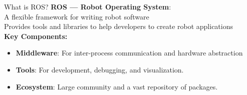 \documentclass[compress]{beamer}
\begin{document}
\begin{frame}{What is ROS?}
        \textbf{ROS --- Robot Operating System}: \\ A flexible framework for writing robot software\\
        
        \footnotesize
        Provides tools and libraries to help developers to create robot applications\\
        
        \vspace{.5cm}
        \textbf{Key Components:}
        \begin{itemize}
            \item \textbf{Middleware}: For inter-process communication and hardware abstraction
            \item \textbf{Tools}: For development, debugging, and visualization.
            \item \textbf{Ecosystem}: Large community and a vast repository of packages.
        \end{itemize}
\end{frame}
\end{document}
